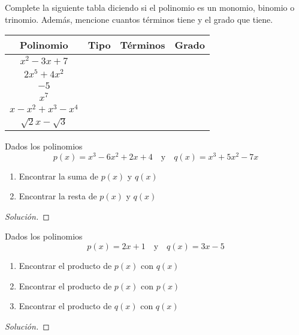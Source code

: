 \documentclass[a4,11pt]{aleph-notas}
\begin{document}
\encabezado

\begin{ejer}
	Complete la siguiente tabla diciendo si el polinomio es un monomio, binomio o trinomio. Adem\'as, mencione cuantos t\'erminos tiene y el grado que tiene.
	\begin{center}
		\begin{tabular}{c|c|c|c}
			Polinomio & Tipo & T\'erminos & Grado \\ \hline
			$x^2 - 3x + 7$ &&&  \\
			$2x^5 + 4x^2$ &&& \\
			$-5$ &&& \\
			$x^7$ &&&  \\
			$x-x^2+x^3-x^4$ &&& \\
			$\sqrt{2} x - \sqrt{3}$ &&&
		\end{tabular}
	\end{center}
\end{ejer}
\begin{ejer}
    Dados los polinomios
    $$
    p(x) = x^3-6x^2 + 2x + 4 \quad \text{y} \quad q(x) = x^3 + 5x^2 - 7x
    $$
    \begin{enumerate}[label=\textit{\alph*)}]
        \item Encontrar la suma de $p(x)$ y $q(x)$
        \item Encontrar la resta de $p(x)$ y $q(x)$
    \end{enumerate}
\end{ejer}

\begin{proof}[Solución]\hspace{0pt}
   
\end{proof}


\begin{ejer}
	Dados los polinomios
	$$
	p(x) = 2x+1  \quad \text{y} \quad q(x) =3x-5
	$$
	\begin{enumerate}[label=\textit{\alph*)}]
		\item Encontrar el producto de $p(x)$ con $q(x)$
		\item Encontrar el producto de $p(x)$ con $p(x)$
		\item Encontrar el producto de $q(x)$ con $q(x)$
	\end{enumerate}
\end{ejer}
\begin{proof}[Solución]\hspace{0pt}
	
\end{proof}
\end{document}
